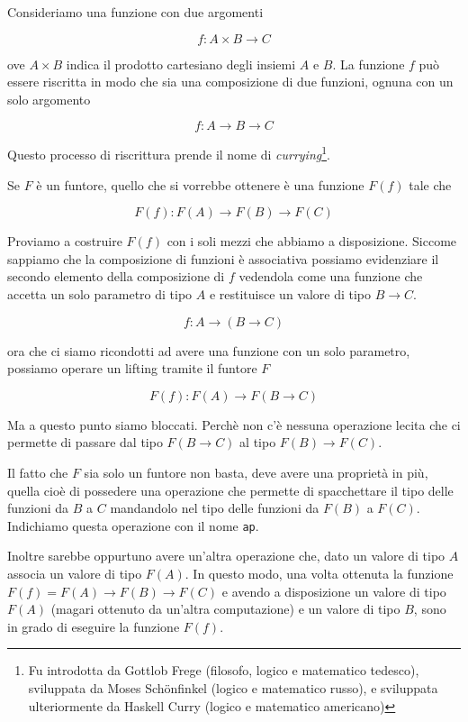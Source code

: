 \documentclass[12pt]{article}
\begin{document}
Consideriamo una funzione con due argomenti

$$
f: A \times B \rightarrow C
$$

ove $A \times B$ indica il prodotto cartesiano degli insiemi $A$ e $B$.
La funzione $f$ può essere riscritta in modo che sia una composizione di due funzioni, ognuna con un solo argomento

$$
f: A \rightarrow B \rightarrow C
$$

Questo processo di riscrittura prende il nome di \emph{currying}\footnote{Fu introdotta da Gottlob Frege (filosofo, logico e matematico tedesco), sviluppata da Moses Schönfinkel (logico e matematico russo), e sviluppata ulteriormente da Haskell Curry (logico e matematico americano)}.

Se $F$ è un funtore, quello che si vorrebbe ottenere è una funzione $F(f)$ tale che

$$
F(f): F(A) \rightarrow F(B) \rightarrow F(C)
$$

Proviamo a costruire $F(f)$ con i soli mezzi che abbiamo a disposizione.
Siccome sappiamo che la composizione di funzioni è associativa possiamo evidenziare il secondo elemento della composizione di $f$
vedendola come una funzione che accetta un solo parametro di tipo $A$ e restituisce un valore di tipo $B \rightarrow C$.

$$
f: A \rightarrow (B \rightarrow C)
$$

ora che ci siamo ricondotti ad avere una funzione con un solo parametro, possiamo operare un lifting tramite il funtore $F$

$$
F(f): F(A) \rightarrow F(B \rightarrow C)
$$

Ma a questo punto siamo bloccati.
Perchè non c'è nessuna operazione lecita che ci permette di passare dal tipo $F(B \rightarrow C)$ al tipo $F(B) \rightarrow F(C)$.

Il fatto che $F$ sia solo un funtore non basta, deve avere una proprietà in più, quella cioè di possedere una operazione che permette di
spacchettare il tipo delle funzioni da $B$ a $C$ mandandolo nel tipo delle funzioni da $F(B)$ a $F(C)$.
Indichiamo questa operazione con il nome \texttt{ap}.

Inoltre sarebbe oppurtuno avere un'altra operazione che, dato un valore di tipo $A$ associa un valore di tipo $F(A)$.
In questo modo, una volta ottenuta la funzione $F(f) = F(A) \rightarrow F(B) \rightarrow F(C)$ e avendo a disposizione un valore di tipo $F(A)$
(magari ottenuto da un'altra computazione) e un valore di tipo $B$, sono in grado di eseguire la funzione $F(f)$.
\end{document}
